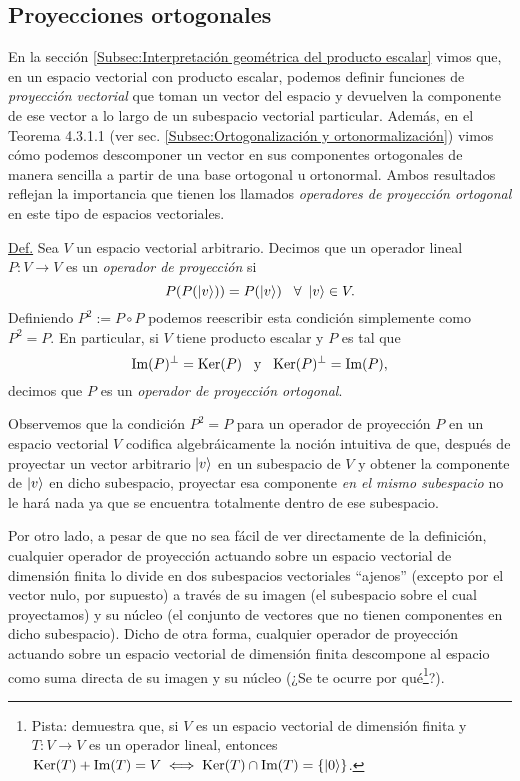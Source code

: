 \documentclass[12pt,libertine]{book}
\begin{document}
\newpage
\subsection*{Proyecciones ortogonales}

En la sección \ref{Subsec:Interpretación geométrica del producto escalar} vimos que, en un espacio vectorial con producto escalar, podemos definir funciones de \emph{proyección vectorial} que toman un vector del espacio y devuelven la componente de ese vector a lo largo de un subespacio vectorial particular. Además, en el Teorema 4.3.1.1 (ver sec. \ref{Subsec:Ortogonalización y ortonormalización}) vimos cómo podemos descomponer un vector en sus componentes ortogonales de manera sencilla a partir de una base ortogonal u ortonormal. Ambos resultados reflejan la importancia que tienen los llamados \emph{operadores de proyección ortogonal} en este tipo de espacios vectoriales.

\begin{tcolorbox}
    \underline{Def.} Sea $V$ un espacio vectorial arbitrario. Decimos que un operador lineal $P:V\to V$ es un \emph{operador de proyección} si \[
        P(P(\ket{v}))=P(\ket{v}) \hspace{3mm} \forall \ \ket{v}\in V.
    \] Definiendo $P^2:=P\circ P$ podemos reescribir esta condición simplemente como $P^2=P$. En particular, si $V$ tiene producto escalar y $P$ es tal que \[
        \text{Im}(P)^\perp=\text{Ker}(P)\hspace{3mm}\text{y}\hspace{3mm}\text{Ker}(P)^\perp=\text{Im}(P),
    \] decimos que $P$ es un \emph{operador de proyección ortogonal}.
\end{tcolorbox}

Observemos que la condición $P^2=P$ para un operador de proyección $P$ en un espacio vectorial $V$ codifica algebráicamente la noción intuitiva de que, después de proyectar un vector arbitrario $\ket{v}$ en un subespacio de $V$ y obtener la componente de $\ket{v}$ en dicho subespacio, proyectar esa componente \emph{en el mismo subespacio} no le hará nada \textemdash ya que se encuentra totalmente dentro de ese subespacio.

\vspace{3mm}
Por otro lado, a pesar de que no sea fácil de ver directamente de la definición, cualquier operador de proyección actuando sobre un espacio vectorial de dimensión finita lo divide en dos subespacios vectoriales ``ajenos'' (excepto por el vector nulo, por supuesto) a través de su imagen (el subespacio sobre el cual proyectamos) y su núcleo (el conjunto de vectores que no tienen componentes en dicho subespacio). Dicho de otra forma, cualquier operador de proyección actuando sobre un espacio vectorial de dimensión finita descompone al espacio como suma directa de su imagen y su núcleo (¿Se te ocurre por qué\footnote{Pista: demuestra que, si $V$ es un espacio vectorial de dimensión finita y $T:V\to V$ es un operador lineal, entonces $\text{Ker}(T)+\text{Im}(T)=V \iff \text{Ker}(T)\cap\text{Im}(T)=\{\ket{0}\}$.}?). 
\end{document}
